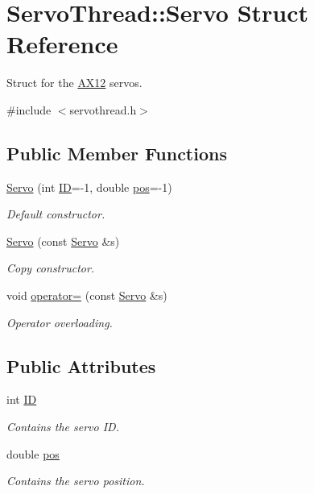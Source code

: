 \hypertarget{a00007}{}\section{Servo\+Thread\+:\+:Servo Struct Reference}
\label{a00007}


Struct for the \hyperlink{a00001}{A\+X12} servos.  




{\ttfamily \#include $<$servothread.\+h$>$}

\subsection*{Public Member Functions}
\begin{DoxyCompactItemize}
\item 
\hyperlink{a00007_a219887703cad3d3252fdde5a1aae586e}{Servo} (int \hyperlink{a00007_a06b514c42113aa85fd1703fc88fca7ce}{I\+D}=-\/1, double \hyperlink{a00007_a9fa0aa56944b9b0bb9d66303d5bd4b59}{pos}=-\/1)
\begin{DoxyCompactList}\small\item\em Default constructor. \end{DoxyCompactList}\item 
\hyperlink{a00007_acb657f09a5d04424d134791ca501cb54}{Servo} (const \hyperlink{a00007}{Servo} \&s)
\begin{DoxyCompactList}\small\item\em Copy constructor. \end{DoxyCompactList}\item 
void \hyperlink{a00007_acfe010f463ec6e85718a9883689811cb}{operator=} (const \hyperlink{a00007}{Servo} \&s)
\begin{DoxyCompactList}\small\item\em Operator overloading. \end{DoxyCompactList}\end{DoxyCompactItemize}
\subsection*{Public Attributes}
\begin{DoxyCompactItemize}
\item 
int \hyperlink{a00007_a06b514c42113aa85fd1703fc88fca7ce}{I\+D}
\begin{DoxyCompactList}\small\item\em Contains the servo I\+D. \end{DoxyCompactList}\item 
double \hyperlink{a00007_a9fa0aa56944b9b0bb9d66303d5bd4b59}{pos}
\begin{DoxyCompactList}\small\item\em Contains the servo position. \end{DoxyCompactList}\end{DoxyCompactItemize}


